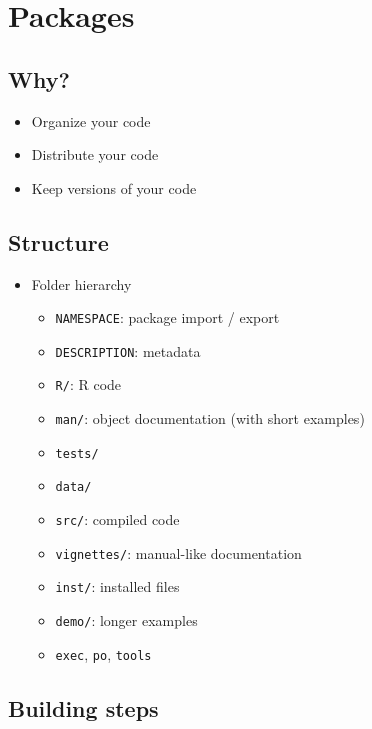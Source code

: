 \documentclass[]{book}
\providecommand{\tightlist}{%
  \setlength{\itemsep}{0pt}\setlength{\parskip}{0pt}}
\theoremstyle{definition}
\theoremstyle{definition}
\theoremstyle{definition}
\theoremstyle{remark}
\begin{document}
\chapter{Packages}\label{packages}

\section{Why?}\label{why}

\begin{itemize}
\item
  Organize your code
\item
  Distribute your code
\item
  Keep versions of your code
\end{itemize}

\section{Structure}\label{structure}

\begin{itemize}
\tightlist
\item
  Folder hierarchy

  \begin{itemize}
  \tightlist
  \item
    \texttt{NAMESPACE}: package import / export
  \item
    \texttt{DESCRIPTION}: metadata
  \item
    \texttt{R/}: R code
  \item
    \texttt{man/}: object documentation (with short examples)
  \item
    \texttt{tests/}
  \item
    \texttt{data/}
  \item
    \texttt{src/}: compiled code
  \item
    \texttt{vignettes/}: manual-like documentation
  \item
    \texttt{inst/}: installed files
  \item
    \texttt{demo/}: longer examples
  \item
    \texttt{exec}, \texttt{po}, \texttt{tools}
  \end{itemize}
\end{itemize}

\section{Building steps}\label{building-steps}
\end{document}
